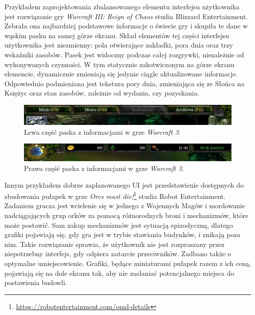 Przykładem zaprojektowania zbalansowanego elementu interfejsu użytkownika jest rozwiązanie gry \textit{Warcraft III: Reign of Chaos} studia Blizzard Entertainment.
Zebrała ona najbardziej podstawowe informacje o świecie gry i skupiła te dane w wąskim pasku na samej górze ekranu.
Skład elementów tej części interfejsu użytkownika jest niezmienny: pola otwierające zakładki, pora dnia oraz trzy wskaźniki zasobów. Pasek jest widoczny
podczas całej rozgrywki, niezależnie od wykonywanych czynności. W tym statycznie zakotwiczonym na górze ekranu elemencie, dynamicznie
zmieniają się jedynie ciągle aktualizowane informacje. Odpowiednio podmieniana jest tekstura pory dnia, zmieniająca się ze Słońca
na Księżyc oraz stan zasobów, zależnie od wydania, czy pozyskania.

\begin{figure}[htbp]
    \centering
    \includegraphics[width=1.0\textwidth]{images/ui/warcraft3_gorny_pasek_lewy.png}
    \caption{Lewa część paska z informacjami w grze \textit{Warcraft 3}.}\label{fig:Warcraft3}
\end{figure}

\begin{figure}[htbp]
    \centering
    \includegraphics[width=1.0\textwidth]{images/ui/warcraft3_gorny_pasek_prawy.png}
    \caption[Prawa część paska z informacjami w grze \textit{Warcraft 3}]{Prawa część paska z informacjami w grze \textit{Warcraft 3}\protect\footnotemark.}\label{fig:Warcraft3}
\end{figure}


Innym przykładem dobrze zaplanowanego UI jest przedstawienie dostępnych do zbudowania pułapek w grze
\textit{Orcs must die!}\footnote{\url{https://robotentertainment.com/omd-details}} studia Robot Entertainment. Zadaniem gracza jest wcielenie się w jednego z Wojennych Magów i mordowanie nadciągających grup orków za pomocą różnorodnych broni
i mechanizmów, które może postawić. Sam zakup mechanizmów jest sytuacją epizodyczną, dlatego grafiki pojawiają się, gdy gra jest w trybie stawiania budynków, 
i znikają poza nim. Takie rozwiązanie sprawia, że użytkownik nie jest rozpraszany przez niepotrzebny interfejs, gdy odpiera natarcie przeciwników. Zadbano także o
optymalne umiejscowienie. Grafiki, będące miniaturami pułapek razem z ich ceną, pojawiają się na dole ekranu tak, aby nie zasłaniać potencjalnego miejsca do postawienia budowli.

